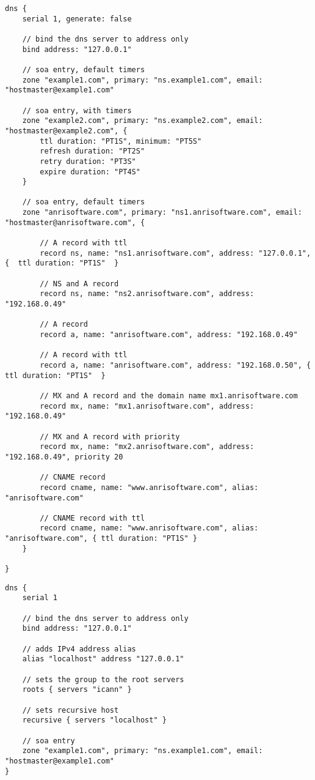 \begin{lstlisting}[style=Java,label=lst:dns_example_script,
title={Dns example script.}]
dns {
    serial 1, generate: false

    // bind the dns server to address only
    bind address: "127.0.0.1"

    // soa entry, default timers
    zone "example1.com", primary: "ns.example1.com", email: "hostmaster@example1.com"

    // soa entry, with timers
    zone "example2.com", primary: "ns.example2.com", email: "hostmaster@example2.com", {
        ttl duration: "PT1S", minimum: "PT5S"
        refresh duration: "PT2S"
        retry duration: "PT3S"
        expire duration: "PT4S"
    }

    // soa entry, default timers
    zone "anrisoftware.com", primary: "ns1.anrisoftware.com", email: "hostmaster@anrisoftware.com", {

        // A record with ttl
        record ns, name: "ns1.anrisoftware.com", address: "127.0.0.1", {  ttl duration: "PT1S"  }

        // NS and A record
        record ns, name: "ns2.anrisoftware.com", address: "192.168.0.49"

        // A record
        record a, name: "anrisoftware.com", address: "192.168.0.49"

        // A record with ttl
        record a, name: "anrisoftware.com", address: "192.168.0.50", { ttl duration: "PT1S"  }

        // MX and A record and the domain name mx1.anrisoftware.com
        record mx, name: "mx1.anrisoftware.com", address: "192.168.0.49"

        // MX and A record with priority
        record mx, name: "mx2.anrisoftware.com", address: "192.168.0.49", priority 20

        // CNAME record
        record cname, name: "www.anrisoftware.com", alias: "anrisoftware.com"

        // CNAME record with ttl
        record cname, name: "www.anrisoftware.com", alias: "anrisoftware.com", { ttl duration: "PT1S" }
    }

}
\end{lstlisting}

\begin{lstlisting}[style=Java,label=lst:dns_example_recursive_script,
title={Dns service with recursive look-up.}]
dns {
    serial 1

    // bind the dns server to address only
    bind address: "127.0.0.1"

    // adds IPv4 address alias
    alias "localhost" address "127.0.0.1"

    // sets the group to the root servers
    roots { servers "icann" }

    // sets recursive host
    recursive { servers "localhost" }

    // soa entry
    zone "example1.com", primary: "ns.example1.com", email: "hostmaster@example1.com"
}
\end{lstlisting}

